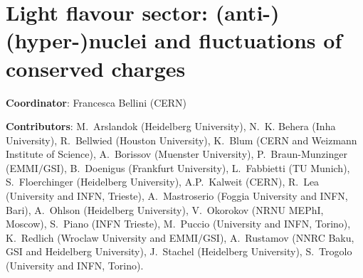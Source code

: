 \documentclass[../report.tex]{subfiles}
\providecommand{\main}{..}
\begin{document}
\clearpage
\section{Light flavour sector: (anti-)(hyper-)nuclei and fluctuations of conserved charges}
\label{sec:lf}

{ \small
\noindent \textbf{Coordinator}: Francesca Bellini (CERN)

\noindent \textbf{Contributors}: 
M.~Arslandok (Heidelberg University), 
N.~K. Behera (Inha University), 
R.~Bellwied (Houston University), 
K.~Blum (CERN and Weizmann Institute of Science), 
A.~Borissov (Muenster University), 
P.~Braun-Munzinger (EMMI$/$GSI), 
B.~Doenigus (Frankfurt University), 
L.~Fabbietti (TU Munich), 
S.~Floerchinger (Heidelberg University), 
A.P.~Kalweit (CERN), 
R.~Lea (University and INFN, Trieste), 
A.~Mastroserio (Foggia University and INFN, Bari),
A.~Ohlson (Heidelberg University), 
V.~Okorokov (NRNU MEPhI, Moscow), 
S.~Piano (INFN Trieste), 
M.~Puccio (University and INFN, Torino), 
K.~Redlich (Wroclaw University and EMMI$/$GSI), 
A.~Rustamov (NNRC Baku, GSI and Heidelberg University), 
J.~Stachel (Heidelberg University), 
S.~Trogolo (University and INFN, Torino).
}





%
\end{document}
